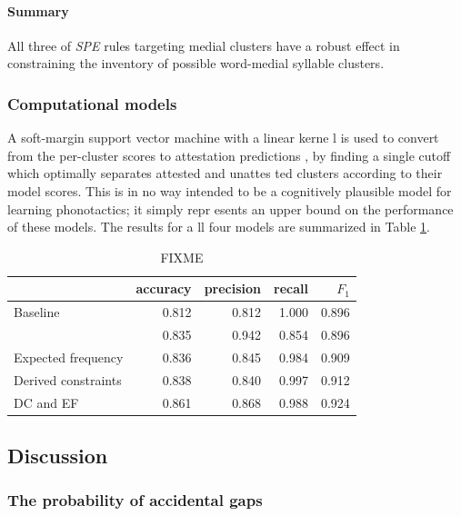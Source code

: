 \paragraph{Summary} All three of \emph{SPE} rules targeting medial clusters have a robust effect in constraining the inventory of possible word-medial syllable clusters.

\subsubsection{Computational models}

A soft-margin support vector machine \citep{Cortes1995} with a linear kerne
l is used to convert from the per-cluster scores to attestation predictions
, by finding a single cutoff which optimally separates attested and unattes
ted clusters according to their model scores. This is in no way intended to
 be a cognitively plausible model for learning phonotactics; it simply repr
esents an upper bound on the performance of these models. The results for a
ll four models are summarized in Table \ref{cmresults}.

\begin{table} 
\centering
\begin{tabular}{l | rrrr}
\toprule
                    & accuracy & precision & recall & $F_1$ \\
\midrule
Baseline            & 0.812    & 0.812     & 1.000  & 0.896 \\
\citet{Hayes2008a}  & 0.835    & 0.942     & 0.854  & 0.896 \\
Expected frequency  & 0.836    & 0.845     & 0.984  & 0.909 \\
Derived constraints & 0.838    & 0.840     & 0.997  & 0.912 \\
DC and EF           & 0.861    & 0.868     & 0.988  & 0.924 \\
\bottomrule
\end{tabular}
\caption{FIXME}
\label{cmresults}
\end{table}

\subsection{Discussion}

\subsubsection{The probability of accidental gaps}

